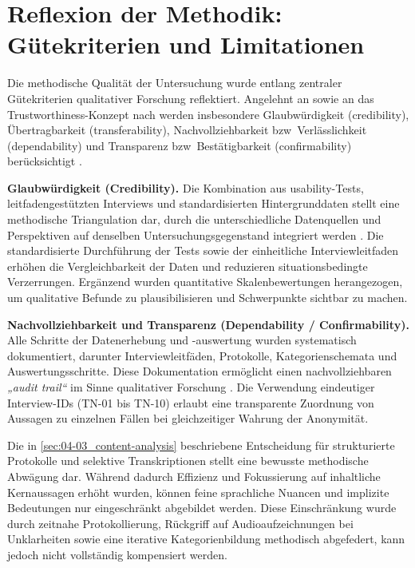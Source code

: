 \section{Reflexion der Methodik: Gütekriterien und Limitationen}
\label{sec:04-04_method-reflection}

Die methodische Qualität der Untersuchung wurde entlang zentraler Gütekriterien qualitativer Forschung reflektiert. Angelehnt an \citeauthor{422:Flick2018} sowie an das Trustworthiness-Konzept nach \citeauthor{423:LincolnGuba1985} werden insbesondere Glaubwürdigkeit (credibility), Übertragbarkeit (transferability), Nachvollziehbarkeit \acrshort{bzw}\ Verlässlichkeit (dependability) und Transparenz \acrshort{bzw}\ Bestätigbarkeit (confirmability) berücksichtigt \cite{422:Flick2018,423:LincolnGuba1985}.

\textbf{Glaubwürdigkeit (Credibility).}  
Die Kombination aus \Gls{usability}-Tests, leitfadengestützten Interviews und standardisierten Hintergrunddaten stellt eine methodische Triangulation dar, durch die unterschiedliche Datenquellen und Perspektiven auf denselben Untersuchungsgegenstand integriert werden \cite{422:Flick2018,124:Triangulation2023}. Die standardisierte Durchführung der Tests sowie der einheitliche Interviewleitfaden erhöhen die Vergleichbarkeit der Daten und reduzieren situationsbedingte Verzerrungen. Ergänzend wurden quantitative Skalenbewertungen herangezogen, um qualitative Befunde zu plausibilisieren und Schwerpunkte sichtbar zu machen.

\textbf{Nachvollziehbarkeit und Transparenz (Dependability / Confirmability).}  
Alle Schritte der Datenerhebung und -auswertung wurden systematisch dokumentiert, darunter Interviewleitfäden, Protokolle, Kategorienschemata und Auswertungsschritte. Diese Dokumentation ermöglicht einen nachvollziehbaren \textit{„audit trail“} im Sinne qualitativer Forschung \cite{422:Flick2018,204:TrustworthinessGuide2020}. Die Verwendung eindeutiger Interview-IDs (TN-01 bis TN-10) erlaubt eine transparente Zuordnung von Aussagen zu einzelnen Fällen bei gleichzeitiger Wahrung der Anonymität.

Die in \autoref{sec:04-03_content-analysis} beschriebene Entscheidung für strukturierte Protokolle und selektive Transkriptionen stellt eine bewusste methodische Abwägung dar. Während dadurch Effizienz und Fokussierung auf inhaltliche Kernaussagen erhöht wurden, können feine sprachliche Nuancen und implizite Bedeutungen nur eingeschränkt abgebildet werden. Diese Einschränkung wurde durch zeitnahe Protokollierung, Rückgriff auf Audioaufzeichnungen bei Unklarheiten sowie eine iterative Kategorienbildung methodisch abgefedert, kann jedoch nicht vollständig kompensiert werden.

